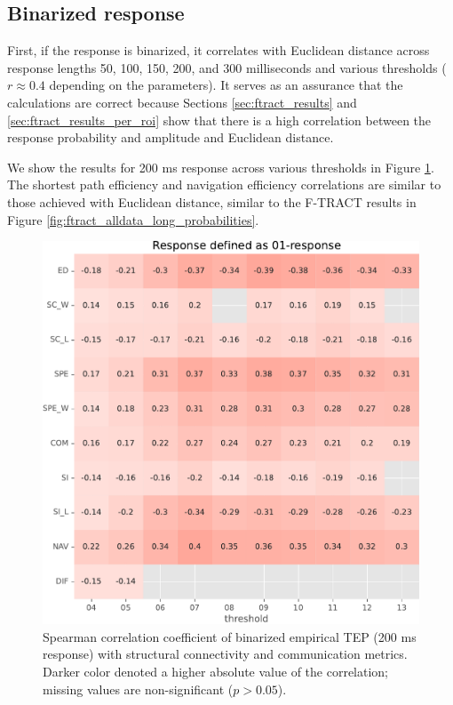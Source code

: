\subsection{Binarized response}

First, if the response is binarized, it correlates with Euclidean distance across response lengths 50, 100, 150, 200, and 300 milliseconds and various thresholds ($r \approx 0.4$ depending on the parameters). It serves as an assurance that the calculations are correct because Sections \ref{sec:ftract_results} and \ref{sec:ftract_results_per_roi} show that there is a high correlation between the response probability and amplitude and Euclidean distance. 

We show the results for 200 ms response across various thresholds in Figure \ref{fig:tms_01_200}. The shortest path efficiency and navigation efficiency correlations are similar to those achieved with Euclidean distance, similar to the F-TRACT results in Figure \ref{fig:ftract_alldata_long_probabilities}.

\begin{figure}
    \centering
    \includegraphics[width=\textwidth]{images/nootebook_generated/pytepfit_results/empirical/200/not_over_threshold_nan/Response defined as 01-response.pdf}
    \caption[Binarized TEP (200 ms) correlations]{Spearman correlation coefficient of binarized empirical TEP (200 ms response) with structural connectivity and communication metrics. Darker color denoted a higher absolute value of the correlation; missing values are non-significant ($p>0.05$).}
    \label{fig:tms_01_200}
\end{figure}

